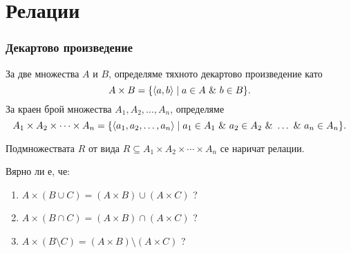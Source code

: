 \chapter{Релации}

\subsection{Декартово произведение}
За две множества $A$ и $B$, определяме тяхното декартово произведение като
\[A\times B = \{\langle{a,b}\rangle\mid a\in A\ \&\ b\in B\}.\]
За краен брой множества $A_1,A_2,\dots,A_n$, определяме
\[A_1\times A_2\times\cdots\times A_n = \{\pair{a_1,a_2,\dots,a_n}\mid a_1 \in A_1\ \&\ a_2\in A_2\ \&\ \dots\ \&\ a_n \in A_n\}.\]

Подмножествата $R$ от вида $R \subseteq A_1\times A_2\times\cdots\times A_n$ се наричат релации.

\begin{problem}
  Вярно ли е, че:
  \begin{enumerate}[1)]
  \item 
    $A\times(B\cup C) = (A\times B) \cup (A\times C)$ ?
  \item 
    $A\times(B\cap C) = (A\times B) \cap (A\times C)$ ?
  \item 
    $A\times(B\setminus C) = (A\times B) \setminus (A\times C)$ ?
  \end{enumerate}
\end{problem}

